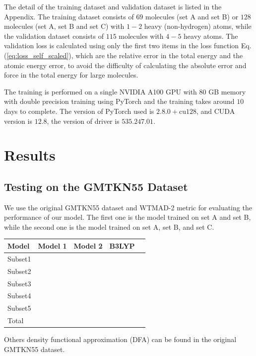 \documentclass[%
twocolumn,
amsmath,
amssymb,
groupedaddress,
reprint,%
]{revtex4-2}
\newcommand{\eq}[1]{Eq.\,(\ref{#1})}
\begin{document}
The detail of the training dataset and validation dataset is listed in the Appendix.
% 
The training dataset consists of $69$ molecules (set A and set B) or $128$ molecules  (set A, set B and set C) with $1-2$ heavy (non-hydrogen) atoms, while the validation dataset consists of $115$ molecules with $4-5$ heavy atoms.
% 
The validation loss is calculated using only the first two items in the loss function \eq{eq:loss_self_scaled}, which are the relative error in the total energy and the atomic energy error, to avoid the difficulty of calculating the absolute error and force in the total energy for large molecules.

The training is performed on a single NVIDIA A100 GPU with 80 GB memory with double precision training using PyTorch \cite{paszkePyTorchImperativeStyle2019-12-03} and the training takes around $10$ days to complete. The version of PyTorch used is $2.8.0+$cu$128$, and CUDA version is $12.8$, the version of driver is $535.247.01$.

\section{Results}
\subsection{Testing on the GMTKN55 Dataset}
We use the original GMTKN55 dataset and WTMAD-2 metric for evaluating the performance of our model.
% 
The first one is the model trained on set A and set B, while the second one is the model trained on set A, set B, and set C.
% 
\begin{table}
  \begin{tabular}{|l|c|c|c|c|}
    \hline
    Model   & Model 1 & Model 2 & B3LYP & \\
    \hline
    Subset1 &         &         &       & \\
    Subset2 &         &         &       & \\
    Subset3 &         &         &       & \\
    Subset4 &         &         &       & \\
    Subset5 &         &         &       & \\
    \hline
    Total   &         &         &       & \\
    \hline
  \end{tabular}
\end{table}
% 
Others density functional approximation (DFA) can be found in the original GMTKN55 dataset.
\end{document}
